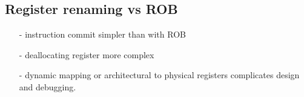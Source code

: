 \subsection{Register renaming vs ROB}\label{subsec:register-renaming-vs-rob}
\begin{itemize}[noitemsep]
    \item[-] instruction commit simpler than with ROB
    \item[-] deallocating register more complex
    \item[-] dynamic mapping or architectural to physical registers complicates design and debugging.
\end{itemize}


